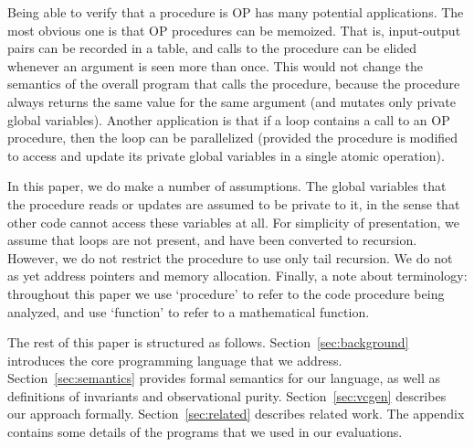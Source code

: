 Being able to verify that a procedure is OP has many potential
applications. The most obvious one is that OP procedures can be
memoized. That is, input-output pairs can be recorded in a table, and calls
to the procedure can be elided whenever an argument is seen more than
once. This would not change the semantics of the overall program that calls
the procedure, because the procedure always returns the same value for the
same argument (and mutates only private global variables). Another
application is that if a loop contains a call to an OP procedure, then the
loop can be parallelized (provided the procedure is modified to access and
update its private global variables in a single atomic operation).

In this paper, we do make a number of assumptions. The global variables
that the procedure reads or updates are assumed to be private to it, in the
sense that other code cannot access these variables at all.  For simplicity
of presentation, we assume that loops are not present, and have been
converted to recursion. However, we do not restrict the procedure to use
only tail recursion. We do not as yet address pointers and memory
allocation. Finally, a note about terminology: throughout this paper we
use `procedure' to refer to the code procedure being analyzed, and use
`function' to refer to a mathematical function. 

The rest of this paper is structured as
follows. Section~\ref{sec:background} introduces the core programming
language that we address. Section~\ref{sec:semantics} provides formal
semantics for our language, as well as definitions of invariants and
observational purity. Section~\ref{sec:vcgen} describes our approach
formally.
Section~\ref{sec:related} describes related work. The appendix contains some details of the programs
that we used in our evaluations. 

